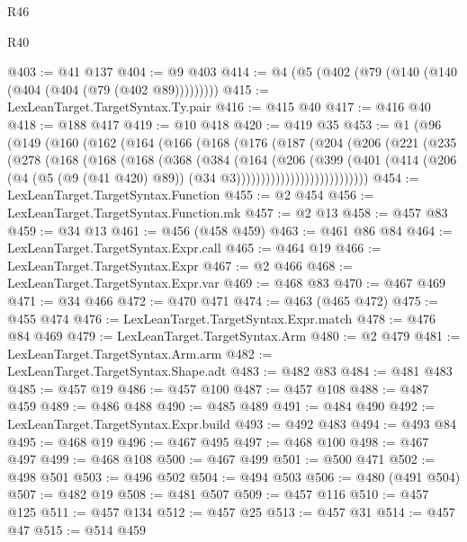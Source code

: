 \begin{lexlean}{R46}
\begin{lexlean}{R40}
\begin{coremodule}
{{{{{{{{{{{{{{{{{{{{{{{{{{{{{{{{{{{{{{{{{{{{{{{{{{{{{{{{{{{{{{{{{{{{{{{{{{{{{{{{{{{{{{{{{{{{{{{{{{{{{{{{{{{{{@403 := @41 @137
@404 := @9 @403
@414 := @4 (@5 (@402 (@79 (@140 (@140 (@404 (@404 (@79 (@402 @89)))))))))
@415 := LexLeanTarget.TargetSyntax.Ty.pair
@416 := @415 @40
@417 := @416 @40
@418 := @188 @417
@419 := @10 @418
@420 := @419 @35
@453 := @1
    (@96
      (@149
        (@160
          (@162
            (@164
              (@166
                (@168
                  (@176
                    (@187
                      (@204
                        (@206
                          (@221
                            (@235
                              (@278
                                (@168
                                  (@168
                                    (@168
                                      (@368
                                        (@384
                                          (@164
                                            (@206
                                              (@399
                                                (@401
                                                  (@414
                                                    (@206
                                                      (@4
                                                        (@5 (@9 (@41 @420) @89))
                                                        (@34 @3)))))))))))))))))))))))))))
@454 := LexLeanTarget.TargetSyntax.Function
@455 := @2 @454
@456 := LexLeanTarget.TargetSyntax.Function.mk
@457 := @2 @13
@458 := @457 @83
@459 := @34 @13
@461 := @456 (@458 @459)
@463 := @461 @86 @84
@464 := LexLeanTarget.TargetSyntax.Expr.call
@465 := @464 @19
@466 := LexLeanTarget.TargetSyntax.Expr
@467 := @2 @466
@468 := LexLeanTarget.TargetSyntax.Expr.var
@469 := @468 @83
@470 := @467 @469
@471 := @34 @466
@472 := @470 @471
@474 := @463 (@465 @472)
@475 := @455 @474
@476 := LexLeanTarget.TargetSyntax.Expr.match
@478 := @476 @84 @469
@479 := LexLeanTarget.TargetSyntax.Arm
@480 := @2 @479
@481 := LexLeanTarget.TargetSyntax.Arm.arm
@482 := LexLeanTarget.TargetSyntax.Shape.adt
@483 := @482 @83
@484 := @481 @483
@485 := @457 @19
@486 := @457 @100
@487 := @457 @108
@488 := @487 @459
@489 := @486 @488
@490 := @485 @489
@491 := @484 @490
@492 := LexLeanTarget.TargetSyntax.Expr.build
@493 := @492 @483
@494 := @493 @84
@495 := @468 @19
@496 := @467 @495
@497 := @468 @100
@498 := @467 @497
@499 := @468 @108
@500 := @467 @499
@501 := @500 @471
@502 := @498 @501
@503 := @496 @502
@504 := @494 @503
@506 := @480 (@491 @504)
@507 := @482 @19
@508 := @481 @507
@509 := @457 @116
@510 := @457 @125
@511 := @457 @134
@512 := @457 @25
@513 := @457 @31
@514 := @457 @47
@515 := @514 @459
}}}}}}}}}}}}}}}}}}}}}}}}}}}}}}}}}}}}}}}}}}}}}}}}}}}}}}}}}}}}}}}}}}}}}}}}}}}}}}}}}}}}}}}}}}}}}}}}}}}}}}}}}}}}}
\end{coremodule}
\end{lexlean}
\end{lexlean}
